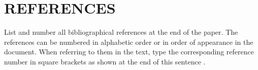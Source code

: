 \documentclass{article}
\begin{document}
\section{REFERENCES}
\label{sec:ref}

List and number all bibliographical references at the end of the paper.  The references can be numbered in alphabetic order or in order of appearance in the document.  When referring to them in the text, type the corresponding reference number in square brackets as shown at the end of this sentence \cite{C2}.



\end{document}
